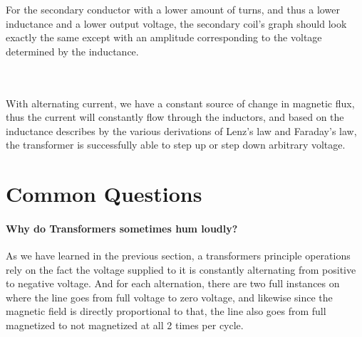 \documentclass[12pt]{article}
\begin{document}
For the secondary conductor with a lower amount of turns, and thus a lower inductance and a lower output voltage, the secondary coil's graph should look exactly the same except with an amplitude corresponding to the voltage determined by the inductance. 
\vspace{5mm}\\
\\
\vspace{5mm}\\
With alternating current, we have a constant source of change in magnetic flux, thus the current will constantly flow through the inductors, and based on the inductance describes by the various derivations of Lenz's law and Faraday's law, the transformer is successfully able to step up or step down arbitrary voltage.


\section{Common Questions}
\paragraph{Why do Transformers sometimes hum loudly?} As we have learned in the previous section, a transformers principle operations rely on the fact the voltage supplied to it is constantly alternating from positive to negative voltage. And for each alternation,  there are two full instances on where the line goes from full voltage to zero voltage, and likewise since the magnetic field is directly proportional to that, the line also goes from full magnetized to not magnetized at all 2 times per cycle. 
\end{document}

